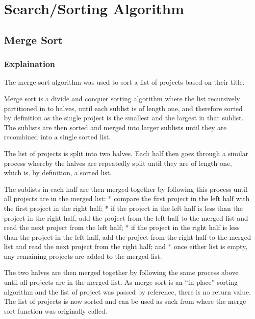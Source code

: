\documentclass[
  english,
  a4paper,
,tablecaptionabove
]{scrartcl}
\begin{document}
\newpage

\hypertarget{searchsorting-algorithm}{%
\section{Search/Sorting Algorithm}\label{searchsorting-algorithm}}

\hypertarget{merge-sort}{%
\subsection{Merge Sort}\label{merge-sort}}

\hypertarget{explaination}{%
\subsubsection{Explaination}\label{explaination}}

The merge sort algorithm was used to sort a list of projects based on
their title.

Merge sort is a divide and conquer sorting algorithm where the list
recursively partitioned in to halves, until each sublist is of length
one, and therefore sorted by definition as the single project is the
smallest and the largest in that sublist. The sublists are then sorted
and merged into larger sublists until they are recombined into a single
sorted list.

The list of projects is split into two halves. Each half then goes
through a similar process whereby the halves are repeatedly split until
they are of length one, which is, by definition, a sorted list.

The sublists in each half are then merged together by following this
process until all projects are in the merged list: * compare the first
project in the left half with the first project in the right half; * if
the project in the left half is less than the project in the right half,
add the project from the left half to the merged list and read the next
project from the left half; * if the project in the right half is less
than the project in the left half, add the project from the right half
to the merged list and read the next project from the right half; and *
once either list is empty, any remaining projects are added to the
merged list.

The two halves are then merged together by following the same process
above until all projects are in the merged list. As merge sort is an
\enquote{in-place} sorting algorithm and the list of project was passed
by reference, there is no return value. The list of projects is now
sorted and can be used as such from where the merge sort function was
originally called.
\end{document}
